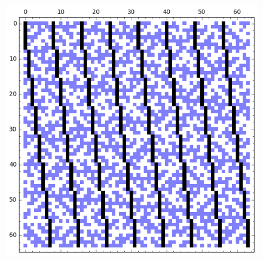 \documentclass[pdf,sprung,slideColor,nocolorBG]{beamer}
\begin{document}
\begin{frame}
\begin{figure}
\begin{minipage}{.48\textwidth}
  \includegraphics[width=.9\linewidth]{../matrix_plot/c6_2_bent_cayley_graph_index_matrix.png}
  \label{fig:6_2_bent_cayley_graph_index_matrix}
\end{minipage}
\end{figure}
\end{frame}
% 
% 
\end{document}
